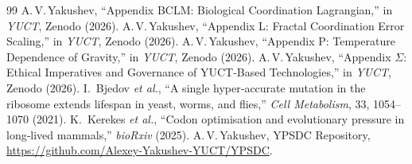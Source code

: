 \documentclass[11pt,a4paper]{article}
\begin{document}
	\begin{thebibliography}{99}
		 A.\,V.\,Yakushev, ``Appendix BCLM: Biological Coordination Lagrangian,'' in \emph{YUCT}, Zenodo (2026).
		 A.\,V.\,Yakushev, ``Appendix L: Fractal Coordination Error Scaling,'' in \emph{YUCT}, Zenodo (2026).
		 A.\,V.\,Yakushev, ``Appendix P: Temperature Dependence of Gravity,'' in \emph{YUCT}, Zenodo (2026).
		 A.\,V.\,Yakushev, ``Appendix \(\Sigma\): Ethical Imperatives and Governance of YUCT‑Based Technologies,'' in \emph{YUCT}, Zenodo (2026).
		 I.~Bjedov \emph{et al.}, ``A single hyper‑accurate mutation in the ribosome extends lifespan in yeast, worms, and flies,'' \emph{Cell Metabolism}, 33, 1054–1070 (2021).
		 K.~Kerekes \emph{et al.}, ``Codon optimisation and evolutionary pressure in long‑lived mammals,'' \emph{bioRxiv} (2025).
		 A.\,V.\,Yakushev, YPSDC Repository, \url{https://github.com/Alexey-Yakushev-YUCT/YPSDC}.
	\end{thebibliography}
	
\end{document}

